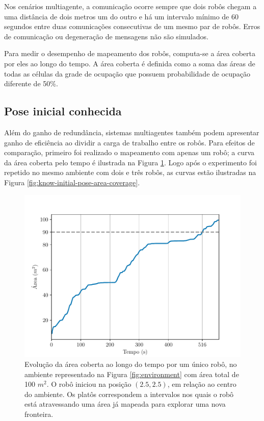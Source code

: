 Nos cenários multiagente, a comunicação ocorre sempre que dois robôs 
chegam a uma distância de dois metros um do outro e há um intervalo 
mínimo de 60 segundos entre duas comunicações consecutivas de um mesmo 
par de robôs. Erros de comunicação ou degeneração de mensagens não são 
simulados.

Para medir o desempenho de mapeamento dos robôs, 
computa-se a área coberta 
por eles ao longo do tempo. A área coberta é definida como a soma das 
áreas de todas as células da grade de ocupação que possuem probabilidade 
de ocupação diferente de 50\%.

\subsection{Pose inicial conhecida}
\label{sec:exp-known-initial-pose}
Além do ganho de redundância, sistemas multiagentes também podem 
apresentar ganho de eficiência ao dividir a carga de trabalho entre os 
robôs. Para efeitos de comparação, primeiro foi realizado o mapeamento 
com apenas um robô; a curva da área coberta pelo tempo é ilustrada na 
Figura \ref{fig:area-coverage-single-robot}. Logo após o experimento foi repetido no mesmo ambiente com dois e três 
robôs, as curvas estão ilustradas na Figura \ref{fig:know-initial-pose-area-coverage}.

\begin{figure}
  \centering
  \includegraphics[width=.6\textwidth]{figs/area_coverage_single_robot.pdf}
  \caption{Evolução da área coberta ao longo do tempo por um único robô, 
  no ambiente representado na Figura \ref{fig:environment} com área total 
  de 100 $m^2$. O robô iniciou na posição $(2.5, 2.5)$, em relação ao centro do ambiente. Os platôs correspondem a intervalos nos quais o robô está atravessando uma área já mapeada para explorar uma nova fronteira.}
  \label{fig:area-coverage-single-robot}
\end{figure}

